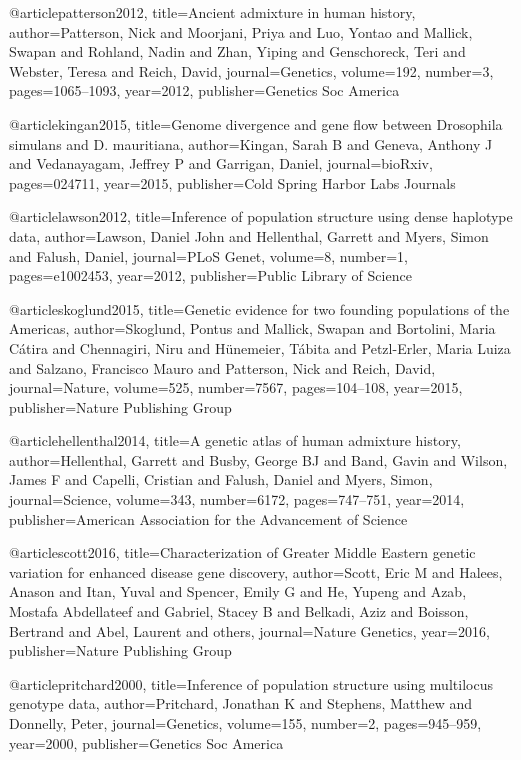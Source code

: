 @article{patterson2012,
  title={Ancient admixture in human history},
  author={Patterson, Nick and Moorjani, Priya and Luo, Yontao and Mallick, Swapan and Rohland, Nadin and Zhan, Yiping and Genschoreck, Teri and Webster, Teresa and Reich, David},
  journal={Genetics},
  volume={192},
  number={3},
  pages={1065--1093},
  year={2012},
  publisher={Genetics Soc America}
}

@article{kingan2015,
  title={Genome divergence and gene flow between Drosophila simulans and D. mauritiana},
  author={Kingan, Sarah B and Geneva, Anthony J and Vedanayagam, Jeffrey P and Garrigan, Daniel},
  journal={bioRxiv},
  pages={024711},
  year={2015},
  publisher={Cold Spring Harbor Labs Journals}
}

@article{lawson2012,
  title={Inference of population structure using dense haplotype data},
  author={Lawson, Daniel John and Hellenthal, Garrett and Myers, Simon and Falush, Daniel},
  journal={PLoS Genet},
  volume={8},
  number={1},
  pages={e1002453},
  year={2012},
  publisher={Public Library of Science}
}

@article{skoglund2015,
  title={Genetic evidence for two founding populations of the Americas},
  author={Skoglund, Pontus and Mallick, Swapan and Bortolini, Maria C{\'a}tira and Chennagiri, Niru and H{\"u}nemeier, T{\'a}bita and Petzl-Erler, Maria Luiza and Salzano, Francisco Mauro and Patterson, Nick and Reich, David},
  journal={Nature},
  volume={525},
  number={7567},
  pages={104--108},
  year={2015},
  publisher={Nature Publishing Group}
}

@article{hellenthal2014,
  title={A genetic atlas of human admixture history},
  author={Hellenthal, Garrett and Busby, George BJ and Band, Gavin and Wilson, James F and Capelli, Cristian and Falush, Daniel and Myers, Simon},
  journal={Science},
  volume={343},
  number={6172},
  pages={747--751},
  year={2014},
  publisher={American Association for the Advancement of Science}
}

@article{scott2016,
  title={Characterization of Greater Middle Eastern genetic variation for enhanced disease gene discovery},
  author={Scott, Eric M and Halees, Anason and Itan, Yuval and Spencer, Emily G and He, Yupeng and Azab, Mostafa Abdellateef and Gabriel, Stacey B and Belkadi, Aziz and Boisson, Bertrand and Abel, Laurent and others},
  journal={Nature Genetics},
  year={2016},
  publisher={Nature Publishing Group}
}

@article{pritchard2000,
  title={Inference of population structure using multilocus genotype data},
  author={Pritchard, Jonathan K and Stephens, Matthew and Donnelly, Peter},
  journal={Genetics},
  volume={155},
  number={2},
  pages={945--959},
  year={2000},
  publisher={Genetics Soc America}
}

